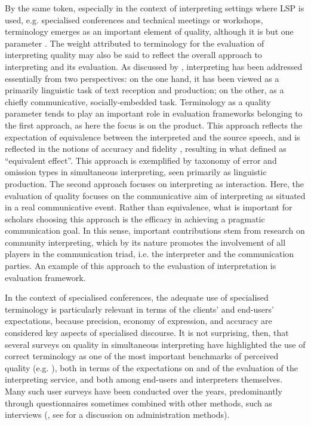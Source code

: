 By the same token, especially in the context of interpreting settings where LSP is used, e.g. specialised conferences and technical meetings or workshops, terminology emerges as an important element of quality, although it is but one parameter \citep[231]{garcia2011terminologie}. The weight attributed to terminology for the evaluation of interpreting quality may also be said to reflect the overall approach to interpreting and its evaluation. As discussed by \citet{pochhacker_quality_2001, pochhacker_introducing_2004}, interpreting has been addressed essentially from two perspectives: on the one hand, it has been viewed as a primarily linguistic task of text reception and production; on the other, as a chiefly communicative, socially-embedded task. Terminology as a quality parameter tends to play an important role in evaluation frameworks belonging to the first approach, as here the focus is on the product. This approach reflects the expectation of equivalence between the interpreted and the source speech, and is reflected in the notions of accuracy and fidelity \citep{larson_communicative-oriented_1991}, resulting in what \citet[155]{bowen_thoughts_1990} defined as ``equivalent effect''. This approach is exemplified by  taxonomy of error and omission types in simultaneous interpreting, seen primarily as linguistic production.
The second approach focuses on interpreting as interaction. Here, the evaluation of quality focuses on the communicative aim of interpreting as situated in a real communicative event. Rather than equivalence, what is important for scholars choosing this approach is the efficacy in achieving a pragmatic communication goal. In this sense, important contributions stem from research on community interpreting, which by its nature promotes the involvement of all players in the communication triad, i.e. the interpreter and the communication parties. An example of this approach to the evaluation of interpretation is \citet{wadensjo_interpreting_1998,wadensjo_interpreting_2005} evaluation framework.

In the context of specialised conferences, the adequate use of specialised terminology is particularly relevant in terms of the clients' and end-users' expectations, because precision, economy of expression, and accuracy are considered key aspects of specialised discourse.
It is not surprising, then, that several surveys on quality in simultaneous interpreting have highlighted the use of correct terminology as one of the most important benchmarks of perceived quality (e.g. \citealt{gile1990evaluation,pochhacker_simultandolmetschen_1994}), both in terms of the expectations on and of the evaluation of the interpreting service, and both among end-users and interpreters themselves.
Many such user surveys have been conducted over the years, predominantly through questionnaires sometimes combined with other methods, such as interviews (\citealt{mack_user_1995,vuorikoski1993simultaneous,vuorikoski1998user}, see \citealt{garciabecerra2016researchquality} for a discussion on administration methods).

